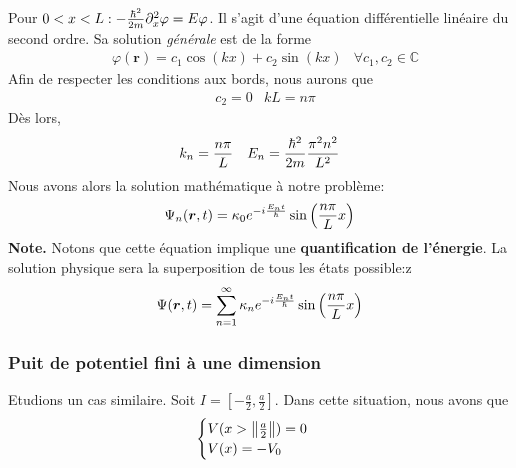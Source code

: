 \documentclass[../notesdecours]{subfiles}
\begin{document}
Pour $0 < x < L : - \frac{\hbar^2}{2m} \partial_x^2 \varphi = E \varphi$. Il s'agit d'une équation différentielle linéaire du second ordre. Sa solution \textit{générale} est de la forme
\begin{align}
&\varphi(\bm{r}) = c_1 \cos \left(kx\right) + c_2\sin \left( kx \right)									&\forall c_1,c_2 \in \mathbb{C}
\label{Kikoo}
\end{align}
Afin de respecter les conditions aux bords, nous aurons que
\begin{align}
&c_2 = 0 &kL = n\pi
\end{align}
Dès lors,
\begin{align}
&k_n = \frac{n\pi}{L} &E_n = \frac{\hbar^2}{2m} \frac{\pi^2n^2}{L^2}
\end{align}
Nous avons alors la solution mathématique à notre problème:
\begin{equation}
\Psi_n (\bm{r},t) = \kappa_0 e^{-i \frac{E_nt}{\hbar}}\sin \left( \frac{n\pi}{L}x \right)
\end{equation}
\textbf{Note.} Notons que cette équation implique une \textbf{quantification de l'énergie}. La solution physique sera la superposition de tous les états possible:z
\begin{equation}
\Psi (\bm{r},t) = \sum_{n = 1}^\infty \kappa_n e^{-i \frac{E_nt}{\hbar}}\sin \left( \frac{n\pi}{L}x \right)
\end{equation}

\subsubsection{Puit de potentiel fini à une dimension}
Etudions un cas similaire. Soit $I = \left[-\frac{a}{2},\frac{a}{2}\right]$. Dans cette situation, nous avons que 
\begin{equation}
\begin{cases} 
V(x > \norm{\frac{a}{2}}) = 0 \\ 
V(x) = -V_0\\
\end{cases}
\end{equation}
\end{document}
